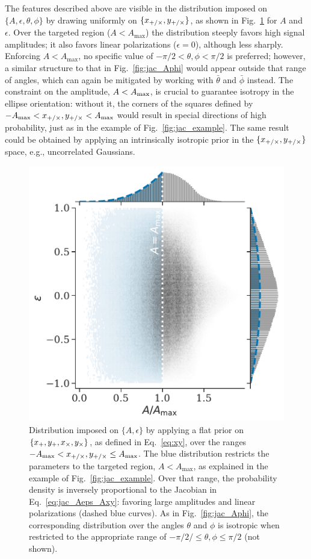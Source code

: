 \documentclass[aps,prd,twocolumn,superscriptaddress,preprintnumbers,floatfix,nofootinbib]{revtex4-2}
\newcommand*{\eq}[1]{Eq.~\eqref{eq:#1}}
\begin{document}
The features described above are visible in the distribution imposed on $\{A,\epsilon,\theta,\phi\}$ by drawing uniformly on $\{x_{+/\times}, y_{+/\times}\}$, as shown in Fig.~\ref{fig:jac_Axy} for $A$ and $\epsilon$.
Over the targeted region ($A < A_{\max}$) the distribution steeply favors high signal amplitudes; it also favors linear polarizations ($\epsilon = 0$), although less sharply.
Enforcing $A < A_{\max}$, no specific value of $-\pi/2 < \theta, \phi < \pi/2$ is preferred; however, a similar structure to that in Fig.~\ref{fig:jac_Aphi} would appear outside that range of angles, which can again be mitigated by working with $\bar{\theta}$ and $\bar{\phi}$ instead.
The constraint on the amplitude, $A < A_{\rm max}$, is crucial to guarantee isotropy in the ellipse orientation: without it, the corners of the squares defined by $-A_{\max} < x_{+/\times},y_{+/\times} < A_{\max}$ would result in special directions of high probability, just as in the example of Fig.~\ref{fig:jac_example}.
The same result could be obtained by applying an intrinsically isotropic prior in the $\{x_{+/\times}, y_{+/\times}\}$ space, e.g., uncorrelated Gaussians.

\begin{figure}
\includegraphics[width=\columnwidth]{jac_Aeps_Axy}
\caption{Distribution imposed on $\{A,\epsilon\}$ by applying a flat prior on $\{x_{+}, y_{+}, x_{\times}, y_{\times}\}$, as defined in \eq{xy}, over the ranges $- A_{\max} < x_{+/\times},y_{+/\times} \leq A_{\max}$.
The blue distribution restricts the parameters to the targeted region, $A < A_{\max}$, as explained in the example of Fig.~\ref{fig:jac_example}.
Over that range, the probability density is inversely proportional to the Jacobian in \eq{jac_Aeps_Axy}: favoring large amplitudes and linear polarizations (dashed blue curves).
As in Fig.~\ref{fig:jac_Aphi}, the corresponding distribution over the angles $\theta$ and $\phi$ is isotropic when restricted to the appropriate range of $-\pi/2/ \leq \theta,\phi \leq \pi/2$ (not shown).
}
\label{fig:jac_Axy}
\end{figure}
\end{document}

